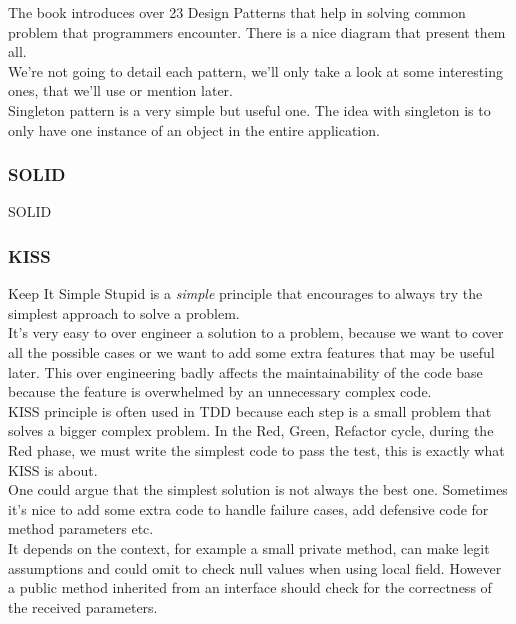 The book introduces over 23 Design Patterns that help in solving common
problem that programmers encounter.
There is a nice diagram that present them all.
\\
\newline
We're not going to detail each pattern, we'll only take a look at some
interesting ones, that we'll use or mention later.\\
\newline
Singleton pattern is a very simple but useful one.
The idea with singleton is to only have one instance of an object in the
entire application.


\subsubsection{SOLID}
SOLID

\subsubsection{KISS}
Keep It Simple Stupid is a \textit{simple} principle that encourages to
always try the simplest approach to solve a problem. \\
\newline
It's very easy to over engineer a solution to a problem, because we want
to cover all the possible cases or we want to add some extra
features that may be useful later.
This over engineering badly affects the maintainability of the code base
because the feature is overwhelmed by an unnecessary complex code. \\
\newline
KISS principle is often used in TDD because each step is a small
problem that solves a bigger complex problem.
In the Red, Green, Refactor cycle, during the Red phase, we must write
the simplest code to pass the test, this is exactly what KISS is about.
\\
\newline
One could argue that the simplest solution is not always the best one.
Sometimes it's nice to add some extra code to handle failure cases, add
defensive code for method parameters etc. \\
It depends on the context, for example a small private method, can make
legit assumptions and could omit to check null values when using
local field.
However a public method inherited from an interface should check for the
correctness of the received parameters.

